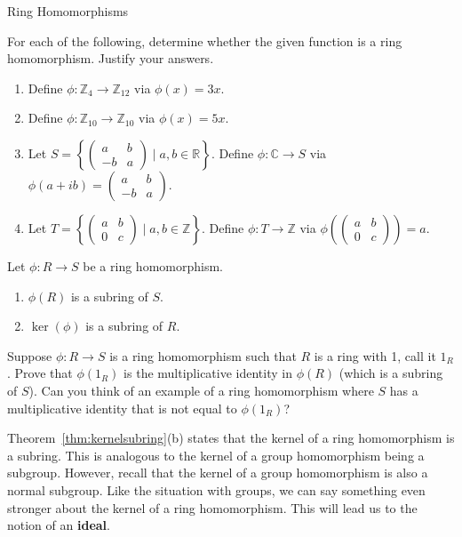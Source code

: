 \begin{section}{Ring Homomorphisms}
\begin{problem}
For each of the following, determine whether the given function is a ring homomorphism.  Justify your answers.
\begin{enumerate}[label=\rm{(\alph*)}]
\item Define $\phi:\mathbb{Z}_4\to \mathbb{Z}_{12}$ via $\phi(x)=3x$.
\item Define $\phi:\mathbb{Z}_{10}\to \mathbb{Z}_{10}$ via $\phi(x)=5x$.
\item Let $\displaystyle S=\left\{\begin{pmatrix}a & b\\ -b & a\end{pmatrix}\mid a, b\in \mathbb{R}\right\}$.  Define $\phi:\mathbb{C}\to S$ via $\displaystyle \phi(a+ib)=\begin{pmatrix}a & b\\ -b & a\end{pmatrix}$.
\item Let $\displaystyle T=\left\{\begin{pmatrix}a & b\\ 0 & c\end{pmatrix}\mid a, b\in \mathbb{Z}\right\}$. Define $\phi:T\to \mathbb{Z}$ via $\displaystyle \phi\left(\begin{pmatrix}a & b\\ 0 & c\end{pmatrix}\right)=a$.
\end{enumerate}
\end{problem}

\begin{theorem}\label{thm:kernelsubring}
Let $\phi:R\to S$ be a ring homomorphism.
\begin{enumerate}[label=\rm{(\alph*)}]
\item $\phi(R)$ is a subring of $S$.
\item $\ker(\phi)$ is a subring of $R$.
\end{enumerate}
\end{theorem}

\begin{problem}
Suppose $\phi:R\to S$ is a ring homomorphism such that $R$ is a ring with 1, call it $1_R$.  Prove that $\phi(1_R)$ is the multiplicative identity in $\phi(R)$ (which is a subring of $S$).  Can you think of an example of a ring homomorphism where $S$ has a multiplicative identity that is not equal to $\phi(1_R)$?
\end{problem}

Theorem~\ref{thm:kernelsubring}(b) states that the kernel of a ring homomorphism is a subring. This is analogous to the kernel of a group homomorphism being a subgroup. However, recall that the kernel of a group homomorphism is also a normal subgroup. Like the situation with groups, we can say something even stronger about the kernel of a ring homomorphism. This will lead us to the notion of an \textbf{ideal}.


\end{section}
